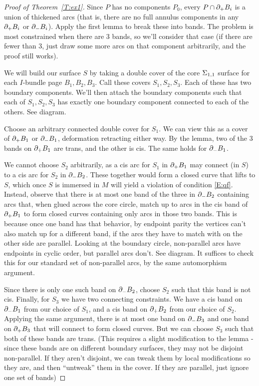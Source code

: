 \begin{proof}[Proof of Theorem~\ref{T:ex1}]

Since $P$ has no components $P_0$, every $P \cap \partial_+B_i$ is a union of
thickened arcs (that is, there are no full annulus components in any $\partial_+B_i$
or $\partial_-B_i$). Apply the first lemma to break these into bands. The problem is
most constrained when there are 3 bands, so we'll consider that case (if there
are fewer than 3, just draw some more arcs on that component arbitrarily, and
the proof still works).

We will build our surface $S$ by taking a double cover of the core $\Sigma_{1,1}$
surface for each $I$-bundle page $B_1,B_2,B_3$. Call these covers
$S_1,S_2,S_3$.  Each of these has two boundary components. We'll then attach
the boundary components such that each of $S_1,S_2,S_3$ has exactly one
boundary component connected to each of the others. See diagram.

Choose an arbitrary connected double cover for $S_1$. We can view this as
a cover of $\partial_+B_1$ or $\partial_-B_1$, deformation retracting either way. By the
lemma, two of the
3 bands on $\partial_+B_1$ are trans, and the other is cis. The same holds for
  $\partial_-B_1$.

We cannot choose $S_2$ arbitrarily, as a cis arc for $S_1$ in $\partial_+B_1$ may
connect (in $S$) to a cis arc for $S_2$ in $\partial_-B_2$. These together would
form a closed curve that lifts to $S$, which once $S$ is immersed in $M$ will
yield a violation of condition \eqref{E:qf}. Instead, observe that there is at
most one band of the three in $\partial_-B_2$ containing arcs that, when glued
across the core circle, match up to arcs in the cis band of $\partial_+B_1$ to form
closed curves containing only arcs in those two bands. This is because once one
band has that behavior, by endpoint parity the vertices can't also match up for
a different band, if the arcs they have to match with on the other side are
parallel. Looking at the boundary circle, non-parallel arcs have endpoints in
cyclic order, but parallel arcs don't. See diagram. It suffices to check this
for our standard set of non-parallel arcs, by the same automorphism argument.

Since there is only one such band on $\partial_-B_2$, choose $S_2$ such that this
band is not cis.  Finally, for $S_3$ we have two connecting constraints. We
have a cis band on $\partial_-B_1$ from our choice of $S_1$, and a cis band on
$\partial_+B_2$ from our choice of $S_2$.  Applying the same argument, there is at
most one band on $\partial_-B_3$ and one band on $\partial_+B_3$ that will connect to
form closed curves. But we can choose $S_3$ such that both of these bands are
trans. (This requires a slight modification to the lemma - since these bands
are on different boundary surfaces, they may not be disjoint non-parallel. If
they aren't disjoint, we can tweak them by local modifications so they are, and
then ``untweak'' them in the cover. If they are parallel, just ignore one set
of bands)


\end{proof}
